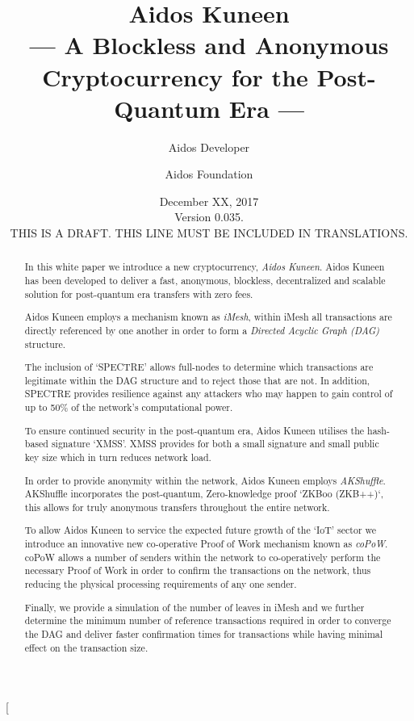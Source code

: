 \documentclass[a4paper,10pt,twocolumn]{article}
\title{Aidos Kuneen \\ --- A Blockless and Anonymous Cryptocurrency for the Post-Quantum Era ---}
\author{
	Aidos Developer \and Aidos Foundation
}
\date{December XX, 2017 \\ Version 0.035.\\ THIS IS A DRAFT. THIS LINE MUST BE INCLUDED IN TRANSLATIONS.}
\begin{document}
\twocolumn[
	\maketitle

\begin{abstract}
		In this white paper we introduce a new cryptocurrency, \emph{Aidos Kuneen}. Aidos Kuneen has been developed to deliver a 
		fast, anonymous, blockless, decentralized and scalable solution for post-quantum era transfers with zero fees. 
		
		Aidos Kuneen employs a mechanism known as \emph{iMesh}, within iMesh all transactions are directly referenced by
		one another in order to form a \emph{Directed Acyclic Graph (DAG)} structure.
		
		The inclusion of `SPECTRE' allows full-nodes to determine which transactions are legitimate within the DAG structure and
		to reject those that are not. In addition, SPECTRE provides resilience against any attackers who may happen to gain 
		control of up to 50\% of the network's computational power.
		
		To ensure continued security in the post-quantum era, Aidos Kuneen utilises the hash-based signature `XMSS'. XMSS
		provides for both a small signature and small public key size which in turn reduces network load.
	
		In order to provide anonymity within the network, Aidos Kuneen employs \emph{AKShuffle}. AKShuffle 	
		incorporates the post-quantum, Zero-knowledge proof `ZKBoo (ZKB++)`, this allows for truly anonymous transfers 
		throughout the entire network.
		
		To allow Aidos Kuneen to service the expected future growth of the `IoT' sector we introduce an innovative new 
		co-operative Proof of Work mechanism known as \emph{coPoW}. coPoW allows a number of senders within the network to 
		co-operatively perform the necessary Proof of Work in order to confirm the transactions on the network, thus reducing 
		the physical processing requirements of any one sender.
		
		Finally, we provide a simulation of the number of leaves in iMesh and we further determine the minimum number of 
		reference transactions required in order to converge the DAG and deliver faster confirmation times for transactions 
		while having minimal effect on the transaction size.
		
		\end{abstract}

		\vspace{0.5cm}
\end{document}
